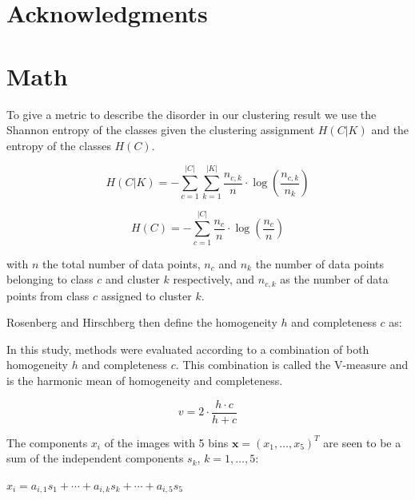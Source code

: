 \documentclass[a4paper,11pt]{article}
\begin{document}
\section*{Acknowledgments}

\appendix{}
\section{Math}

To give a metric to describe the disorder in our clustering result we use the Shannon entropy of the classes given the clustering assignment $H(C|K)$ and the entropy of the classes  $H(C)$.

\begin{equation}
H(C|K) = - \sum_{c=1}^{|C|} \sum_{k=1}^{|K|} \frac{n_{c,k}}{n}
\cdot \log\left(\frac{n_{c,k}}{n_k}\right)
\end{equation}

\begin{equation}
H(C) = - \sum_{c=1}^{|C|} \frac{n_c}{n} \cdot \log\left(\frac{n_c}{n}\right)
\end{equation}

with $n$ the total number of data points, $n_c$ and $n_k$ the number of data points belonging to class $c$ and cluster $k$ respectively, and $n_{c,k}$ as the number of data points from class $c$ assigned to cluster $k$.

Rosenberg and Hirschberg then define the homogeneity $h$ and completeness $c$ as:

    



In this study, methods were evaluated according to a combination of both homogeneity $h$ and completeness $c$. This combination is called the V-measure and is the harmonic mean of homogeneity and completeness.

\begin{equation}
v = 2 \cdot \frac{h \cdot c}{h + c}
\end{equation}

The components $x_i$ of the images with 5 bins $\boldsymbol{x}=(x_1,\ldots,x_5)^T$ are seen to be a sum of the independent components $s_k$, $k=1,\ldots,5$:

$x_i = a_{i,1} s_1 + \cdots + a_{i,k} s_k + \cdots + a_{i,5} s_5$
\end{document}
